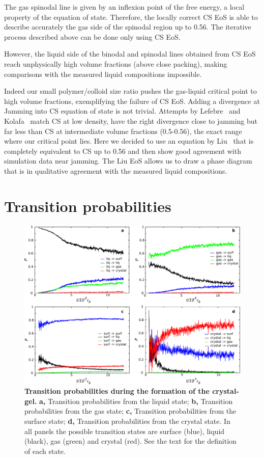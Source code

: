 The gas spinodal line is given by an inflexion point of the free energy, a local property of the equation of state. Therefore, the locally correct CS EoS is able to describe accurately the gas side of the spinodal region up to 0.56. The iterative process described above can be done only using CS EoS.

However, the liquid side of the binodal and spinodal lines obtained from CS EoS reach unphysically high volume fractions (above close packing), making comparisons with the measured liquid compositions impossible.

Indeed our small polymer/colloid size ratio pushes the gas-liquid critical point to high volume fractions, exemplifying the failure of CS EoS. Adding a divergence at Jamming into CS equation of state is not trivial. Attempts by Lefebre~\cite{LeFevre1972} and Kolafa~\cite{Kolafa2004} match CS at low density, have the right divergence close to jamming but far less than CS at intermediate volume fractions (0.5-0.56), the exact range where our critical point lies. Here we decided to use an equation by Liu~\cite{Liu2006a} that is completely equivalent to CS up to 0.56 and then show good agreement with simulation data near jamming.
%
The Liu EoS allows us to draw a phase diagram that is in qualitative agreement with the measured liquid compositions.

\section*{Transition probabilities}
\begin{figure}
 \centering
 \includegraphics[width=14cm]{./sfig1.pdf}
 \caption{{\bf Transition probabilities during the formation of the crystal-gel.}
 {\bf a,} Transition probabilities from the liquid state;
 {\bf b,} Transition probabilities from the gas state;
 {\bf c,} Transition probabilities from the surface state;
 {\bf d,} Transition probabilities from the crystal state. In all panels the possible
 transition states are surface (blue), liquid (black), gas (green) and crystal (red).
 See the text for the definition of each state.
 }
 \label{fig:probabilities}
\end{figure}


